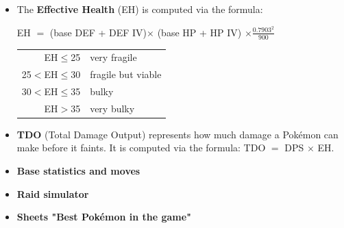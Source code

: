 \documentclass[12pt]{beamer}
\begin{document}
\begin{frame}
\begin{block}{}
\begin{scriptsize}
\begin{itemize}
  \item The \textbf{Effective Health} (EH) is computed via the formula:
\begin{center}
EH $=$ (base DEF + DEF IV)$\times$ (base HP + HP IV) $\times \frac{0.7903^2}{900}$
\end{center}
\begin{center}
\begin{tabular}{rl}
EH$\leq$25   &  very fragile  \\
25$<$EH$\leq$30   &  fragile but viable  \\
30$<$EH$\leq$35   &  bulky  \\
EH$>$35   &  very bulky  \\
\end{tabular}
\end{center}
\item \textbf{TDO} (Total Damage Output) represents how much damage a Pok\'emon can make before it faints. It is computed via the formula: 
TDO $=$ DPS $\times$ EH.
\item \textbf{Base statistics and moves}

\begin{center}
   \href{https://pokemongo.gamepress.gg/}{} \quad \quad 
   \href{https://pokegocomplete.com}{}
\end{center}

\item \textbf{Raid simulator}
   
\begin{center}
   \href{https://pokemongo.gamepress.gg/comprehensive-dps-spreadsheet}{}  \quad \quad 
   \href{https://www.pokebattler.com}{} 
\end{center}

\item \textbf{Sheets  "Best Pokémon in the game"}
\begin{center}
   \href{https://imgur.com/a/1nSSUqM}{}
   \end{center}
\end{itemize}

\end{scriptsize}
\end{block}
\end{frame}


\renewcommand{\baselinestretch}{1.0}
\end{document}
